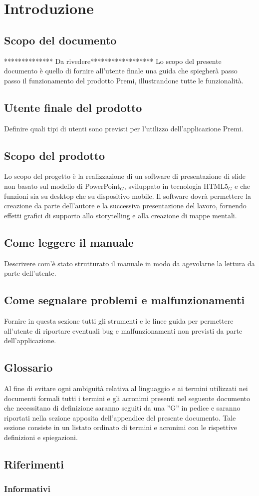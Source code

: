\section{Introduzione}
\subsection{Scopo del documento}
************** Da rivedere******************
Lo scopo del presente documento è quello di fornire all'utente finale una guida che spiegherà passo passo il funzionamento del prodotto Premi, illustrandone tutte le funzionalità.

\subsection{Utente finale del prodotto}
Definire quali tipi di utenti sono previsti per l'utilizzo dell'applicazione Premi.

\subsection{Scopo del prodotto}
Lo scopo del progetto è la realizzazione di un software di presentazione di slide non basato sul modello di PowerPoint$_{G}$, sviluppato in tecnologia HTML5$_{G}$ e che funzioni sia su desktop che su dispositivo mobile. Il software dovrà permettere la creazione da parte dell'autore e la successiva presentazione del lavoro, fornendo effetti grafici di supporto allo storytelling e alla creazione di mappe mentali.

\subsection{Come leggere il manuale}
Descrivere com'è stato strutturato il manuale in modo da agevolarne la lettura da parte dell'utente.

\subsection{Come segnalare problemi e malfunzionamenti}
Fornire in questa sezione tutti gli strumenti e le linee guida per permettere all'utente di riportare eventuali bug e malfunzionamenti non previsti da parte dell'applicazione.

\subsection{Glossario}
Al fine di evitare ogni ambiguità relativa al linguaggio e ai termini utilizzati nei documenti formali tutti i termini e gli acronimi presenti nel seguente documento che necessitano di definizione saranno seguiti da una ”G” in pedice e saranno riportati nella sezione apposita dell'appendice del presente documento. Tale sezione consiste in un listato ordinato di termini e acronimi con le rispettive definizioni e spiegazioni.

\subsection{Riferimenti}
\subsubsection{Informativi}

\newpage